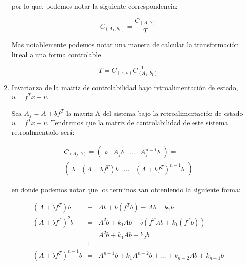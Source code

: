 \begin{enumerate}
                por lo que, podemos notar la siguiente correspondencia:

                \begin{equation*}
                    C_{(A_1, b_1)} = \frac{C_{(A, b)}}{T} 
                \end{equation*}

                Mas notablemente podemos notar una manera de calcular la transformación lineal a una forma controlable.

                \begin{equation}
                    T = C_{(A, b)} C_{(A_1, b_1)}^{-1}
                \end{equation}

            \item Invarianza de la matriz de controlabilidad bajo retroalimentación de estado, $u = f^T x + v$.

                Sea $A_f = A + b f^T$ la matriz A del sistema bajo la retroalimentación de estado $u = f^T x + v$. Tendremos que la matriz de controlabilidad de este sistema retroalimentado será:

                \begin{multline*}
                C_{(A_f, b)} =
                \begin{pmatrix}
                b & A_f b & \dots & A_f^{n-1} b
                \end{pmatrix} = \\
                \begin{pmatrix}
                b & \left( A + b f^T \right) b & \dots & \left( A + b f^T \right)^{n-1} b
                \end{pmatrix}
                \end{multline*}

                en donde podemos notar que los terminos van obteniendo la siguiente forma:

                \begin{eqnarray*}
                    \left( A + b f^T \right) b & = & A b + b (f^T b) = A b + k_1 b\\
                    \left( A + b f^T \right)^{2} b & = & A^2 b + k_1 A b + b (f^T A b + k_1 (f^T b)) \\
                    & = & A^2 b + k_1 A b + k_2 b \\
                    & \vdots & \\
                    \left( A + b f^T \right)^{n-1} b & = & A^{n-1} b + k_1 A^{n-2} b + \dots + k_{n-2} A b + k_{n-1} b
                \end{eqnarray*}


\end{enumerate}
